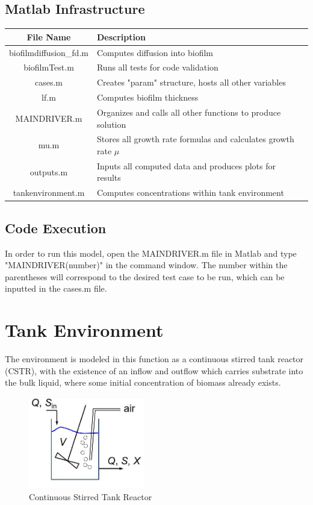 \documentclass[letterpaper, twoside]{article}
\numberwithin{equation}{section}
\begin{document}
\subsection{Matlab Infrastructure}
\begin{tabular}{c l c}
  File Name & Description \\ \hline
  biofilmdiffusion\_fd.m & Computes diffusion into biofilm \\
  biofilmTest.m & Runs all tests for code validation \\
  cases.m & Creates "param" structure, hosts all other variables \\
  lf.m & Computes biofilm thickness \\
  MAINDRIVER.m & Organizes and calls all other functions to produce solution \\
  mu.m & Stores all growth rate formulas and calculates growth rate $\mu$ \\
  outputs.m & Inputs all computed data and produces plots for results \\
  tankenvironment.m & Computes concentrations within tank environment \\
\end{tabular}

\subsection{Code Execution}
In order to run this model, open the MAINDRIVER.m file in Matlab and type "MAINDRIVER(number)" in the command window. The number within the parentheses will correspond to the desired test case to be run, which can be inputted in the cases.m file. 
  
  \section{Tank Environment}
The environment is modeled in this function as a continuous stirred tank reactor (CSTR), with the existence of an inflow and outflow which carries substrate into the bulk liquid, where some initial concentration of biomass already exists.

\begin{figure}[H]
\centering
\includegraphics[width=2in]{CSTR_model.jpg}
\caption{Continuous Stirred Tank Reactor}
\end{figure}
\end{document}
